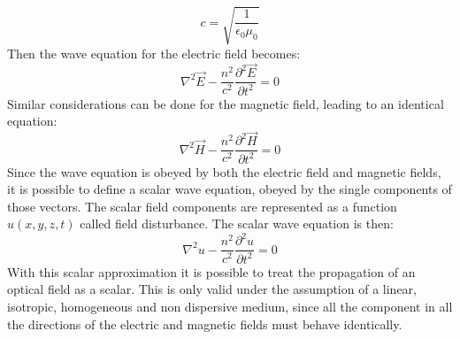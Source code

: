 \begin{equation}
\label{eq:speedoflight}
c=\sqrt{\dfrac{1}{\epsilon_0\mu_0}}
\end{equation} 
Then the wave equation for the electric field becomes:
\begin{equation}
\label{eq:wave_elec}
\nabla^2\overrightarrow{E}-\dfrac{n^2}{c^2}\dfrac{\partial^2\overrightarrow{E}}{\partial t^2}=0
\end{equation}
Similar considerations can be done for the magnetic field, leading to an identical equation:
\begin{equation}
\label{eq:wave_magn}
\nabla^2\overrightarrow{H}-\dfrac{n^2}{c^2}\dfrac{\partial^2\overrightarrow{H}}{\partial t^2}=0
\end{equation}
Since the wave equation is obeyed by both the electric field and magnetic fields, it is possible to define a scalar wave equation, obeyed by the single components of those vectors. The scalar field components are represented as a function $u(x,y,z,t)$ called field disturbance.
The scalar wave equation is then:
\begin{equation}
\label{eq:scalar_wave}
\nabla^2u-\dfrac{n^2}{c^2}\dfrac{\partial^2u}{\partial t^2}=0
\end{equation}
With this scalar approximation it is possible to treat the propagation of an optical field as a scalar. This is only valid under the assumption of a linear, isotropic, homogeneous and non dispersive medium, since all the component in all the directions of the electric and magnetic fields must behave identically.
